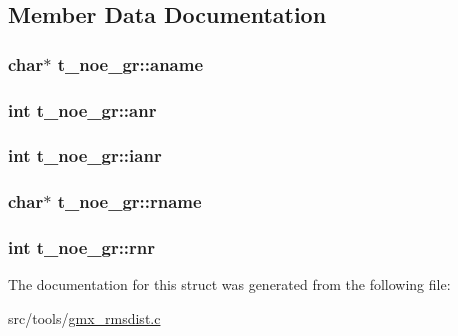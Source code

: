 \subsection{\-Member \-Data \-Documentation}
\hypertarget{structt__noe__gr_a43d94d1f0e6ecddb06841292488e3dda}{
\subsubsection[{aname}]{\setlength{\rightskip}{0pt plus 5cm}char$\ast$ {\bf t\-\_\-noe\-\_\-gr\-::aname}}}\label{structt__noe__gr_a43d94d1f0e6ecddb06841292488e3dda}
\hypertarget{structt__noe__gr_adda451801c5808e33d28f67a400458c1}{
\subsubsection[{anr}]{\setlength{\rightskip}{0pt plus 5cm}int {\bf t\-\_\-noe\-\_\-gr\-::anr}}}\label{structt__noe__gr_adda451801c5808e33d28f67a400458c1}
\hypertarget{structt__noe__gr_a820b67e8cfe73cfc3e11c7e4fcbb8d4e}{
\subsubsection[{ianr}]{\setlength{\rightskip}{0pt plus 5cm}int {\bf t\-\_\-noe\-\_\-gr\-::ianr}}}\label{structt__noe__gr_a820b67e8cfe73cfc3e11c7e4fcbb8d4e}
\hypertarget{structt__noe__gr_a7416ac3db2a9dc62e9e036da0a53198d}{
\subsubsection[{rname}]{\setlength{\rightskip}{0pt plus 5cm}char$\ast$ {\bf t\-\_\-noe\-\_\-gr\-::rname}}}\label{structt__noe__gr_a7416ac3db2a9dc62e9e036da0a53198d}
\hypertarget{structt__noe__gr_a7e8c7115e0ee2eaebb073a94178ae5ff}{
\subsubsection[{rnr}]{\setlength{\rightskip}{0pt plus 5cm}int {\bf t\-\_\-noe\-\_\-gr\-::rnr}}}\label{structt__noe__gr_a7e8c7115e0ee2eaebb073a94178ae5ff}


\-The documentation for this struct was generated from the following file\-:\begin{DoxyCompactItemize}
\item 
src/tools/\hyperlink{gmx__rmsdist_8c}{gmx\-\_\-rmsdist.\-c}\end{DoxyCompactItemize}
